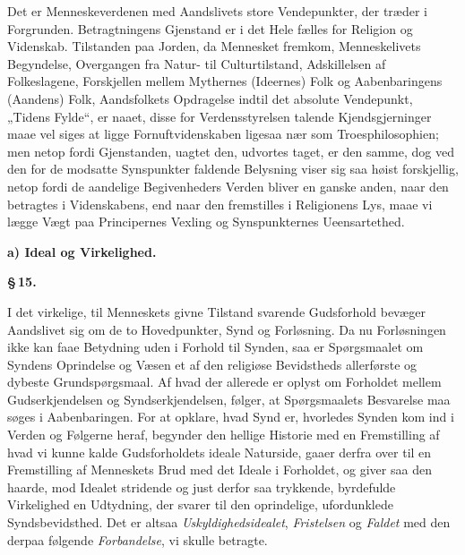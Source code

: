 \documentclass[12pt]{book}
\newcommand{\parmark}[1]{\begin{center}{\bfseries \S\,#1.}\end{center}}
\newcommand{\runhead}[1]{%
  \medskip\begin{center}{\bfseries #1}\end{center}\medskip}
\begin{document}
Det er Menneskeverdenen med Aandslivets store Vendepunkter, der
træder i Forgrunden. Betragtningens Gjenstand er i det Hele fælles
for Religion og Videnskab. Tilstanden paa Jorden, da Mennesket
fremkom, Menneskelivets Begyndelse, Overgangen fra
Natur- til Culturtilstand, Adskillelsen af Folkeslagene, Forskjellen
mellem Mythernes (Ideernes) Folk og Aabenbaringens (Aandens) Folk,
Aandsfolkets Opdragelse indtil det absolute Vendepunkt, „Tidens
Fylde“, er naaet, disse for Verdensstyrelsen talende
Kjendsgjerninger maae vel siges at ligge Fornuftvidenskaben ligesaa
nær som Troesphilosophien; men netop fordi Gjenstanden, uagtet den,
udvortes taget, er den samme, dog ved den for de modsatte Synspunkter
faldende Belysning viser sig saa høist forskjellig, netop fordi de
aandelige Begivenheders Verden bliver en ganske anden, naar den
betragtes i Videnskabens, end naar den fremstilles i Religionens
Lys, maae vi lægge Vægt paa Principernes Vexling og Synspunkternes
Ueensartethed.
\runhead{a) Ideal og Virkelighed.}
\parmark{15}

I det virkelige, til Menneskets givne Tilstand svarende
Gudsforhold bevæger Aandslivet sig om de to Hovedpunkter, Synd og
Forløsning. Da nu Forløsningen ikke kan faae Betydning uden i
Forhold til Synden, saa er Spørgsmaalet om Syndens Oprindelse og
Væsen et af den religiøse Bevidstheds allerførste og dybeste
Grundspørgsmaal. Af hvad der allerede er oplyst om Forholdet mellem
Gudserkjendelsen og Syndserkjendelsen, følger, at Spørgsmaalets
Besvarelse maa søges i Aabenbaringen. For at opklare, hvad Synd er,
hvorledes Synden kom ind i Verden og Følgerne heraf, begynder den
hellige Historie med en Fremstilling af hvad vi kunne kalde
Gudsforholdets ideale Naturside, gaaer derfra over til en
Fremstilling af Menneskets Brud med det Ideale i Forholdet, og giver
saa den haarde, mod Idealet stridende og just derfor saa trykkende,
byrdefulde Virkelighed en Udtydning, der svarer til den oprindelige,
ufordunklede Syndsbevidsthed. Det er altsaa
\emph{Uskyldighedsidealet}, \emph{Fristelsen} og \emph{Faldet} med
den derpaa følgende \emph{Forbandelse}, vi skulle betragte.
\end{document}
